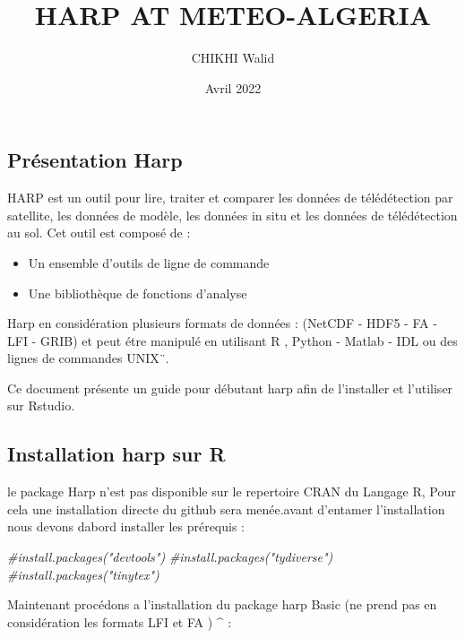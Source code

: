 \documentclass[
]{article}
\title{HARP AT METEO-ALGERIA}
\author{CHIKHI Walid}
\date{Avril 2022}
\newenvironment{Shaded}{\begin{snugshade}}{\end{snugshade}}
\newcommand{\CommentTok}[1]{\textcolor[rgb]{0.56,0.35,0.01}{\textit{#1}}}
\providecommand{\tightlist}{%
  \setlength{\itemsep}{0pt}\setlength{\parskip}{0pt}}
\begin{document}
\maketitle

{
\setcounter{tocdepth}{2}
\tableofcontents
}
\hypertarget{pruxe9sentation-harp}{%
\subsection{Présentation Harp}\label{pruxe9sentation-harp}}

HARP est un outil pour lire, traiter et comparer les données de
télédétection par satellite, les données de modèle, les données in situ
et les données de télédétection au sol. Cet outil est composé de :

\begin{itemize}
\tightlist
\item
  Un ensemble d'outils de ligne de commande
\item
  Une bibliothèque de fonctions d'analyse
\end{itemize}

Harp en considération plusieurs formats de données : (NetCDF - HDF5 - FA
- LFI - GRIB) et peut étre manipulé en utilisant R , Python - Matlab -
IDL ou des lignes de commandes UNIX¨.

Ce document présente un guide pour débutant harp afin de l'installer et
l'utiliser sur Rstudio.

\hypertarget{installation-harp-sur-r}{%
\subsection{Installation harp sur R}\label{installation-harp-sur-r}}

le package Harp n'est pas disponible sur le repertoire CRAN du Langage
R, Pour cela une installation directe du github sera menée.avant
d'entamer l'installation nous devons dabord installer les prérequis :

\begin{Shaded}
\begin{Highlighting}[]
\CommentTok{\#install.packages("devtools")}
\CommentTok{\#install.packages("tydiverse")}
\CommentTok{\#install.packages("tinytex")}
\end{Highlighting}
\end{Shaded}

Maintenant procédons a l'installation du package harp Basic (ne prend
pas en considération les formats LFI et FA ) \^{} :
\end{document}
